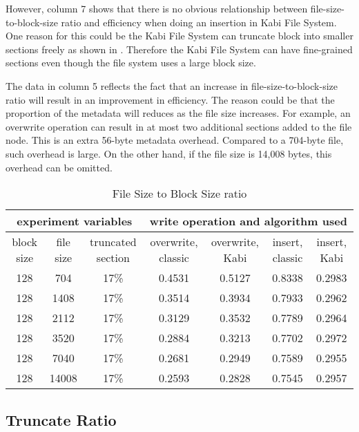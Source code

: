     However, column 7 shows that there is no obvious relationship between file-size-to-block-size ratio and efficiency when doing an insertion in Kabi File System. One reason for this could be the Kabi File System can truncate block into smaller sections freely as shown in . Therefore the Kabi File System can have fine-grained sections even though the file system uses a large block size.
    
    The data in column 5 reflects the fact that an increase in file-size-to-block-size ratio will result in an improvement in efficiency. The reason could be that the proportion of the metadata will reduces as the file size increases. For example, an overwrite operation can result in at most two additional sections added to the file node. This is an extra 56-byte metadata overhead. Compared to a 704-byte file, such overhead is large. On the other hand, if the file size is 14,008 bytes, this overhead can be omitted.

\begin{lscape} 
\begin{table}
\caption{File Size to Block Size ratio}
\label{tab:fb_ratio}
\begin{center}
\begin{tabular}{|c|c|c|c|c|c|c|}
\hline
\multicolumn{3}{|c|}{experiment variables} & \multicolumn{4}{c|}{write operation and algorithm used} \\
\hline
block size & file size & truncated section & overwrite, classic & overwrite, Kabi & insert, classic & insert, Kabi\\
\hline
128 & 704 & 17\% & 0.4531 & 0.5127 & 0.8338 & 0.2983 \\
\hline
128 & 1408 & 17\% & 0.3514 & 0.3934 & 0.7933 & 0.2962 \\
\hline
128 & 2112 & 17\% & 0.3129 & 0.3532 & 0.7789 & 0.2964 \\
\hline
128 & 3520 & 17\% & 0.2884 & 0.3213 & 0.7702 & 0.2972 \\
\hline
128 & 7040 & 17\% & 0.2681 & 0.2949 & 0.7589 & 0.2955 \\
\hline
128 & 14008 & 17\% & 0.2593 & 0.2828 & 0.7545 & 0.2957 \\
\hline
\end{tabular}
\end{center}
\end{table}
\end{lscape}

\subsection{Truncate Ratio}

